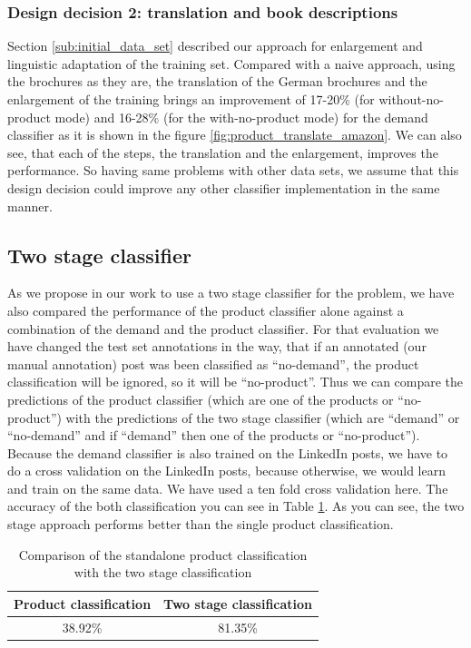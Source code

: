 \subsubsection{Design decision 2: translation and book descriptions}
Section \ref{sub:initial_data_set} described our approach for enlargement and linguistic adaptation of the training set.
Compared with a naive approach, using the brochures as they are, the translation of the German brochures and the enlargement of the training brings an improvement of 17-20\% (for without-no-product mode) and 16-28\% (for the with-no-product mode) for the demand classifier as it is shown in the figure \ref{fig:product_translate_amazon}.
We can also see, that each of the steps, the translation and the enlargement, improves the performance.
So having same problems with other data sets, we assume that this design decision could improve any other classifier implementation in the same manner.

\subsection{Two stage classifier}
\label{sub:two_stage_classifier}

As we propose in our work to use a two stage classifier for the \nto problem, we have also compared the performance of the product classifier alone against a combination of the demand and the product classifier.
For that evaluation we have changed the test set annotations in the way, that if an annotated (our manual annotation) post was been classified as ``no-demand'', the product classification will be ignored, so it will be ``no-product''.
Thus we can compare the predictions of the product classifier (which are one of the products or ``no-product'') with the predictions of the two stage classifier (which are ``demand'' or ``no-demand'' and if ``demand'' then one of the products or ``no-product'').
Because the demand classifier is also trained on the LinkedIn posts, we have to do a cross validation on the LinkedIn posts, because otherwise, we would learn and train on the same data.
We have used a ten fold cross validation here.
The accuracy of the both classification you can see in Table \ref{table:two_stage_eval}.
As you can see, the two stage approach performs better than the single product classification.

\begin{table}
	\centering
	\begin{tabular}{c|c}
		\hline
		Product classification & Two stage classification \\ \hline \hline
		38.92\% & 81.35\% \\ \hline
	\end{tabular}
	\caption{Comparison of the standalone product classification with the two stage classification}
	\label{table:two_stage_eval}
\end{table}


